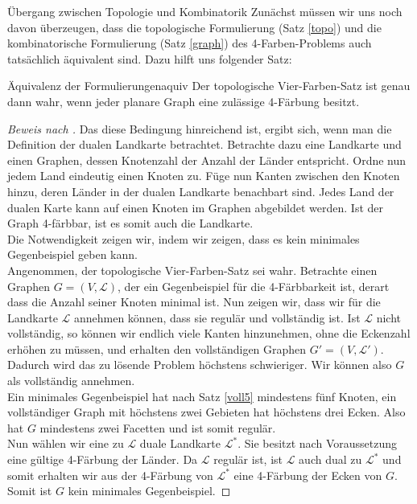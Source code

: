 \begin{chapter}{Übergang zwischen Topologie und Kombinatorik}
 Zunächst müssen wir uns noch davon überzeugen, dass die topologische Formulierung (Satz \ref{topo}) und die kombinatorische Formulierung (Satz \ref{graph}) des 4-Farben-Problems auch tatsächlich äquivalent sind. Dazu hilft uns folgender Satz:
 
 \begin{satzl}{Äquivalenz der Formulierungen}{aquiv}
  Der topologische Vier-Farben-Satz ist genau dann wahr, wenn jeder planare Graph eine zulässige 4-Färbung besitzt.
 \end{satzl}
 
 \begin{proof}[Beweis nach \cite{fritsch}]
  Das diese Bedingung hinreichend ist, ergibt sich, wenn man die Definition der dualen Landkarte betrachtet. Betrachte dazu eine Landkarte und einen Graphen, dessen Knotenzahl der Anzahl der Länder entspricht. Ordne nun jedem Land eindeutig einen Knoten zu. Füge nun Kanten zwischen den Knoten hinzu, deren Länder in der dualen Landkarte benachbart sind. Jedes Land der dualen Karte kann auf einen Knoten im Graphen abgebildet werden. Ist der Graph 4-färbbar, ist es somit auch die Landkarte.\\
  Die Notwendigkeit zeigen wir, indem wir zeigen, dass es kein minimales Gegenbeispiel geben kann.\\
  Angenommen, der topologische Vier-Farben-Satz sei wahr. Betrachte einen Graphen $G=(V,\mathcal{L})$, der ein Gegenbeispiel für die 4-Färbbarkeit ist, derart dass die Anzahl seiner Knoten minimal ist. Nun zeigen wir, dass wir für die Landkarte $\mathcal{L}$ annehmen können, dass sie regulär und vollständig ist. Ist $\mathcal{L}$ nicht vollständig, so können wir endlich viele Kanten hinzunehmen, ohne die Eckenzahl erhöhen zu müssen, und erhalten den vollständigen Graphen $G' = (V,\mathcal{L}')$. Dadurch wird das zu lösende Problem höchstens schwieriger. Wir können also $G$ als vollständig annehmen. \\
  Ein minimales Gegenbeispiel hat nach Satz \ref{voll5} mindestens fünf Knoten, ein vollständiger Graph mit höchstens zwei Gebieten hat höchstens drei Ecken. Also hat $G$ mindestens zwei Facetten und ist somit regulär.\\
  Nun wählen wir eine zu $\mathcal{L}$ duale Landkarte $\mathcal{L}^*$. Sie besitzt nach Voraussetzung eine gültige 4-Färbung der Länder. Da $\mathcal{L}$ regulär ist, ist $\mathcal{L}$ auch dual zu $\mathcal{L}^*$ und somit erhalten wir aus der 4-Färbung von $\mathcal{L}^*$ eine 4-Färbung der Ecken von $G$. Somit ist $G$ kein minimales Gegenbeispiel.
 \end{proof}

\end{chapter}